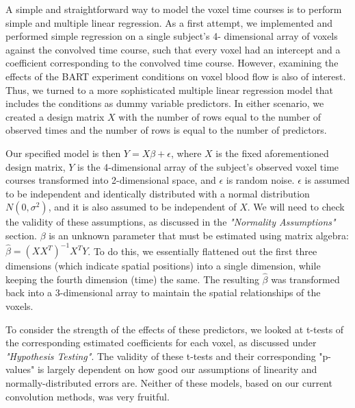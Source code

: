 \par \indent A simple and straightforward way to model the voxel time courses 
is to perform simple and multiple linear regression. As a first attempt, we 
implemented and performed simple regression on a single subject's 4-
dimensional array of voxels against the convolved time course, such that 
every voxel had an intercept and a coefficient corresponding to the convolved 
time course. However, examining the effects of the BART experiment conditions 
on voxel blood flow is also of interest. Thus, we turned to a more 
sophisticated multiple linear regression model that includes the conditions 
as dummy variable predictors. In either scenario, we created a design matrix 
$X$ with the number of rows equal to the number of observed times and the 
number of rows is equal to the number of predictors. 

Our specified model is then $Y = X\beta + \epsilon$, where $X$ is the fixed 
aforementioned design matrix, $Y$ is the 4-dimensional array of the subject's 
observed voxel time courses transformed into 2-dimensional space, and $\epsilon$ 
is random noise. $\epsilon$ is assumed to be independent and identically 
distributed with a normal distribution $N(0, \sigma^2)$, and it is also assumed 
to be independent of $X$. We will need to check the validity of these 
assumptions, as discussed in the \textit{"Normality Assumptions"} section. 
$\beta$ is an unknown parameter that must be estimated using matrix algebra: 
$\hat{\beta} = (X X^T)^{-1} X^T Y$. To do this, we essentially flattened out the 
first three dimensions (which indicate spatial positions) into a single dimension, 
while keeping the fourth dimension (time) the same. The resulting $\hat{\beta}$ 
was transformed back into a 3-dimensional array to maintain the spatial 
relationships of the voxels. 

\par To consider the strength of the effects of these predictors, we looked 
at t-tests of the corresponding estimated coefficients for each voxel, as 
discussed under \textit{"Hypothesis Testing"}. The validity of these t-tests and 
their corresponding "p-values" is largely dependent on how good our assumptions 
of linearity and normally-distributed errors are. Neither of these models, based 
on our current convolution methods, was very fruitful. 

